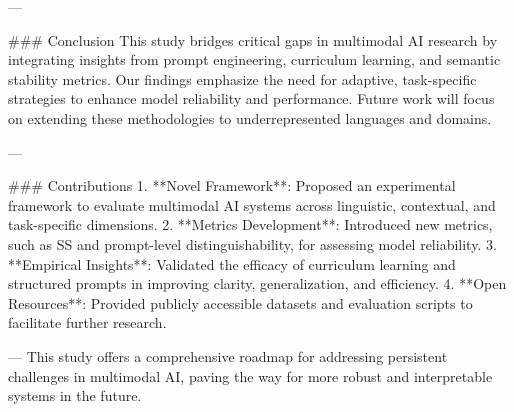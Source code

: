---

### Conclusion  
This study bridges critical gaps in multimodal AI research by integrating insights from prompt engineering, curriculum learning, and semantic stability metrics. Our findings emphasize the need for adaptive, task-specific strategies to enhance model reliability and performance. Future work will focus on extending these methodologies to underrepresented languages and domains.

---

### Contributions  
1. **Novel Framework**: Proposed an experimental framework to evaluate multimodal AI systems across linguistic, contextual, and task-specific dimensions.  
2. **Metrics Development**: Introduced new metrics, such as SS and prompt-level distinguishability, for assessing model reliability.  
3. **Empirical Insights**: Validated the efficacy of curriculum learning and structured prompts in improving clarity, generalization, and efficiency.  
4. **Open Resources**: Provided publicly accessible datasets and evaluation scripts to facilitate further research.  

--- 
This study offers a comprehensive roadmap for addressing persistent challenges in multimodal AI, paving the way for more robust and interpretable systems in the future.  